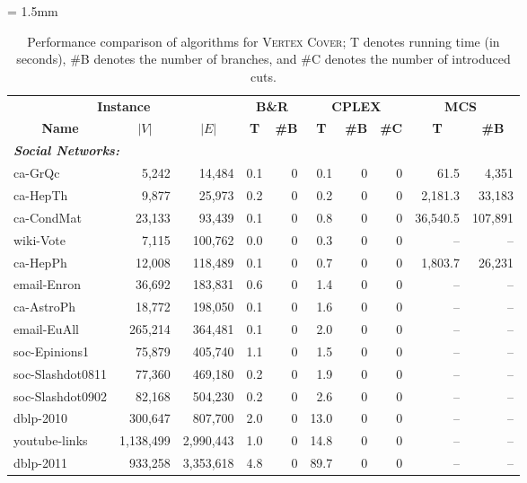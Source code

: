 \documentclass[11pt]{article}
\newcommand{\abs}[1]{\left| #1 \right|}
\begin{document}
{
\tabcolsep = 1.5mm
\begin{table}[p]
\center
\caption{Performance comparison of algorithms for \textsc{Vertex Cover};
T denotes running time (in seconds), \#B denotes the number of branches, and \#C denotes the number of introduced cuts.}
\label{tbl:comparison_vc}
\fontsize{8pt}{0pt}\selectfont
\begin{tabular}{lrr|rr|rrr|rr}
\toprule
\multicolumn{3}{c|}{\textbf{Instance}} & \multicolumn{2}{c|}{\textbf{B\&R}}
 & \multicolumn{3}{c|}{\textbf{CPLEX}} &
\multicolumn{2}{c}{\textbf{MCS~\cite{clique/mcs_walcom10}}} \\
\multicolumn{1}{c}{\textbf{Name}} &
\multicolumn{1}{c}{\textbf{$\abs{V}$}} &
\multicolumn{1}{c|}{\textbf{$\abs{E}$}} &
\multicolumn{1}{c}{\textbf{T}} &
\multicolumn{1}{c|}{\textbf{\#B}} &
\multicolumn{1}{c}{\textbf{T}} &
\multicolumn{1}{c}{\textbf{\#B}} &
\multicolumn{1}{c|}{\textbf{\#C}} &
\multicolumn{1}{c}{\textbf{T}} &
\multicolumn{1}{c}{\textbf{\#B}} \\
\midrule
\multicolumn{4}{l}{\textbf{\textit{Social Networks:}}} \\
ca-GrQc & 5,242 & 14,484 & 0.1 & 0 & 0.1 & 0 & 0 & 61.5 & 4,351 \\
ca-HepTh & 9,877 & 25,973 & 0.2 & 0 & 0.2 & 0 & 0 & 2,181.3 & 33,183 \\
ca-CondMat & 23,133 & 93,439 & 0.1 & 0 & 0.8 & 0 & 0 & 36,540.5 & 107,891 \\
wiki-Vote & 7,115 & 100,762 & 0.0 & 0 & 0.3 & 0 & 0 & -- & -- \\
ca-HepPh & 12,008 & 118,489 & 0.1 & 0 & 0.7 & 0 & 0 & 1,803.7 & 26,231 \\
email-Enron & 36,692 & 183,831 & 0.6 & 0 & 1.4 & 0 & 0 & -- & -- \\
ca-AstroPh & 18,772 & 198,050 & 0.1 & 0 & 1.6 & 0 & 0 & -- & -- \\
email-EuAll & 265,214 & 364,481 & 0.1 & 0 & 2.0 & 0 & 0 & -- & -- \\
soc-Epinions1 & 75,879 & 405,740 & 1.1 & 0 & 1.5 & 0 & 0 & -- & -- \\
soc-Slashdot0811 & 77,360 & 469,180 & 0.2 & 0 & 1.9 & 0 & 0 & -- & -- \\
soc-Slashdot0902 & 82,168 & 504,230 & 0.2 & 0 & 2.6 & 0 & 0 & -- & -- \\
dblp-2010 & 300,647 & 807,700 & 2.0 & 0 & 13.0 & 0 & 0 & -- & -- \\
youtube-links & 1,138,499 & 2,990,443 & 1.0 & 0 & 14.8 & 0 & 0 & -- & -- \\
dblp-2011 & 933,258 & 3,353,618 & 4.8 & 0 & 89.7 & 0 & 0 & -- & -- \\

\end{tabular}
\end{table}}
\end{document}
